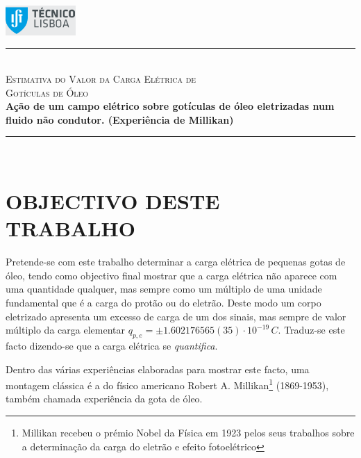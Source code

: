 \documentclass[a4paper,twoside,12pt]{article}      %
\author{Prof. Bernardo B. Carvalho}
\date{ Setembro 2012}
\newcommand{\HRule}{\rule{\linewidth}{0.5mm}}
\begin{document}
 

	\includegraphics[width=0.2\textwidth]{../logo-ist}%

		\HRule \\[0.5cm]
	{ \huge \sf  \textsc{Estimativa do Valor da Carga Elétrica de \\
		Gotículas de Óleo} }\\[0.4cm] %
	{ \large \bfseries  
Ação de um campo elétrico sobre gotículas de óleo eletrizadas num fluido não 
condutor. (Experiência de Millikan)}\\
	\HRule \\%


\section{\sf OBJECTIVO DESTE TRABALHO}

Pretende-se com este trabalho determinar a carga elétrica de pequenas gotas de óleo, tendo como objectivo final mostrar que a carga elétrica não aparece com uma quantidade qualquer, mas sempre como um múltiplo de uma unidade fundamental que é a carga do protão ou do eletrão. Deste modo um corpo eletrizado apresenta um excesso de carga de um dos sinais, mas sempre de valor múltiplo da carga elementar $q_{p,e}=\pm 1.602176565(35)\cdot 10^{-19}\,C$.
Traduz-se este facto dizendo-se que a carga elétrica se \emph{quantifica}.

Dentro das várias experiências elaboradas para mostrar este facto, uma montagem clássica é a do físico americano Robert A. Millikan\footnote{Millikan recebeu o prémio Nobel da Física em 1923 pelos seus trabalhos sobre a determinação da carga do eletrão e efeito fotoelétrico } (1869-1953), também chamada experiência da gota de óleo.
\end{document}
